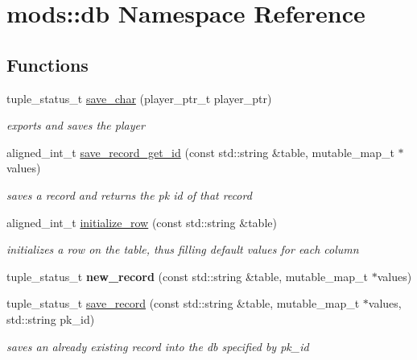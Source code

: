 \hypertarget{namespacemods_1_1db}{}\section{mods\+:\+:db Namespace Reference}
\label{namespacemods_1_1db}
\subsection*{Functions}
\begin{DoxyCompactItemize}
\item 
tuple\+\_\+status\+\_\+t \hyperlink{namespacemods_1_1db_a0f80be75e7e86082ec106bd952307cf6}{save\+\_\+char} (player\+\_\+ptr\+\_\+t player\+\_\+ptr)
\begin{DoxyCompactList}\small\item\em exports and saves the player \end{DoxyCompactList}\item 
aligned\+\_\+int\+\_\+t \hyperlink{namespacemods_1_1db_a56d7528778e7fa35943fb30006046f54}{save\+\_\+record\+\_\+get\+\_\+id} (const std\+::string \&table, mutable\+\_\+map\+\_\+t $\ast$values)
\begin{DoxyCompactList}\small\item\em saves a record and returns the pk id of that record \end{DoxyCompactList}\item 
aligned\+\_\+int\+\_\+t \hyperlink{namespacemods_1_1db_ae6cd02ca445ea237caf3b63fd5c7c36b}{initialize\+\_\+row} (const std\+::string \&table)
\begin{DoxyCompactList}\small\item\em initializes a row on the table, thus filling default values for each column \end{DoxyCompactList}\item 
\mbox{\label{namespacemods_1_1db_a77cb9fac2dd8aad01191849ceedff9ab}} 
tuple\+\_\+status\+\_\+t {\bfseries new\+\_\+record} (const std\+::string \&table, mutable\+\_\+map\+\_\+t $\ast$values)
\item 
tuple\+\_\+status\+\_\+t \hyperlink{namespacemods_1_1db_af5d88db0c82983fcb247497adeeec339}{save\+\_\+record} (const std\+::string \&table, mutable\+\_\+map\+\_\+t $\ast$values, std\+::string pk\+\_\+id)
\begin{DoxyCompactList}\small\item\em saves an already existing record into the db specified by pk\+\_\+id \end{DoxyCompactList}\item 

\end{DoxyCompactItemize}
